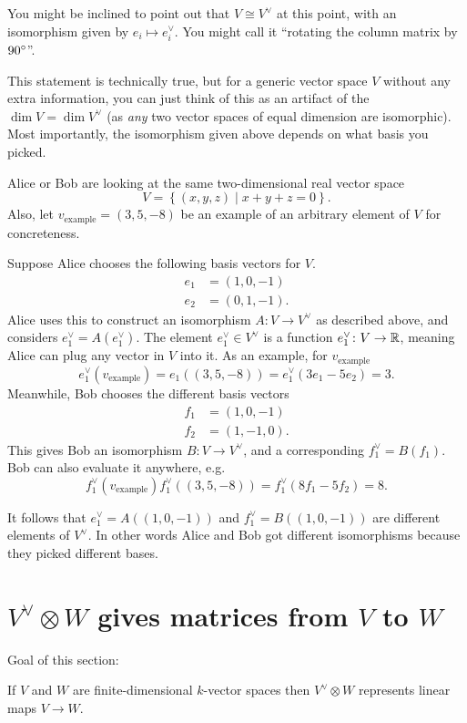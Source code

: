 You might be inclined to point out that $V \cong V^\vee$ at this point,
with an isomorphism given by $e_i \mapsto e_i^\vee$.
You might call it ``rotating the column matrix by $90^\circ$''.

This statement is technically true,
but for a generic vector space $V$ without any extra information,
you can just think of this as an artifact of the $\dim V = \dim V^\vee$
(as \emph{any} two vector spaces of equal dimension are isomorphic).
Most importantly, the isomorphism given above depends
on what basis you picked.

\begin{remark*}
	Alice or Bob are looking at the same two-dimensional real vector space
	\[ V = \left\{ (x,y,z) \mid x+y+z = 0 \right\}. \]
	Also, let $v_{\text{example}} = (3,5,-8)$
	be an example of an arbitrary element of $V$ for concreteness.

	Suppose Alice chooses the following basis vectors for $V$.
	\begin{align*}
		e_1 &= (1,0,-1) \\
		e_2 &= (0,1,-1).
	\end{align*}
	Alice uses this to construct an isomorphism $A \colon V \to V^\vee$
	as described above, and considers $e_1^\vee = A(e_1^\vee)$.
	The element $e_1^\vee \in V^\vee$ is a
	function $e_1^\vee \colon V \to \mathbb R$,
	meaning Alice can plug any vector in $V$ into it.
	As an example, for $v_{\text{example}}$
	\[ e_1^\vee(v_{\text{example}})
		= e_1\left( (3,5,-8) \right)
		= e_1^\vee\left( 3e_1 - 5e_2 \right) = 3. \]
	Meanwhile, Bob chooses the different basis vectors
	\begin{align*}
		f_1 &= (1,0,-1) \\
		f_2 &= (1,-1,0).
	\end{align*}
	This gives Bob an isomorphism $B \colon V \to V^\vee$,
	and a corresponding $f_1^\vee = B(f_1)$.
	Bob can also evaluate it anywhere, e.g.
	\[ f_1^\vee\left( v_{\text{example}} \right)
		f_1^\vee\left( (3, 5, -8) \right)
		= f_1^\vee\left( 8f_1 - 5f_2 \right) = 8. \]
	
	It follows that $e_1^\vee = A\left( (1,0,-1) \right)$
	and $f_1^\vee = B\left( (1,0,-1) \right)$
	are different elements of $V^\vee$.
	In other words Alice and Bob got different isomorphisms
	because they picked different bases.
\end{remark*}

\section{$V^\vee \otimes W$ gives matrices from $V$ to $W$}
Goal of this section:
\begin{moral}
	If $V$ and $W$ are finite-dimensional $k$-vector spaces
	then $V^\vee \otimes W$ represents linear maps $V \to W$.
\end{moral}

